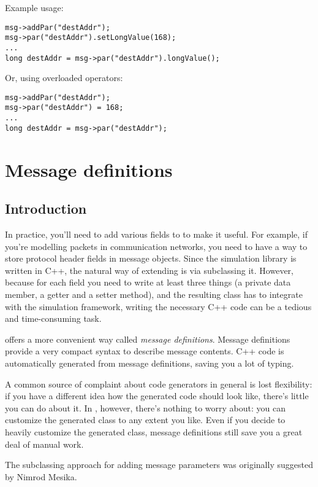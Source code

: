 Example usage:

\begin{verbatim}
msg->addPar("destAddr");
msg->par("destAddr").setLongValue(168);
...
long destAddr = msg->par("destAddr").longValue();
\end{verbatim}

Or, using overloaded operators:

\begin{verbatim}
msg->addPar("destAddr");
msg->par("destAddr") = 168;
...
long destAddr = msg->par("destAddr");
\end{verbatim}


\section{Message definitions}
\label{ch:messages:message-definitions}

\subsection{Introduction}

In practice, you'll need to add various fields to  to
make it useful. For example, if you're modelling packets in communication
networks, you need to have a way to store protocol header fields in message
objects. Since the simulation library is written in C++, the natural way
of extending  is via subclassing it.
However, because for each field you need to write at least
three things (a private data member, a getter and a setter method),
and the resulting class has to integrate with the simulation framework,
writing the necessary C++ code can be a tedious and time-consuming task.

{\opp} offers a more convenient way called \textit{message definitions}.
Message definitions provide a very compact syntax to describe
message contents. C++ code is automatically generated from message
definitions, saving you a lot of typing.

A common source of complaint about code generators in general is
lost flexibility: if you have a different idea how the generated
code should look like, there's little you can do about it.
In {\opp}, however, there's nothing to worry about: you can
customize the generated class to any extent you like.
Even if you decide to heavily customize the generated class,
message definitions still save you a great deal of manual work.

The subclassing approach for adding message parameters was originally
suggested by Nimrod Mesika.


